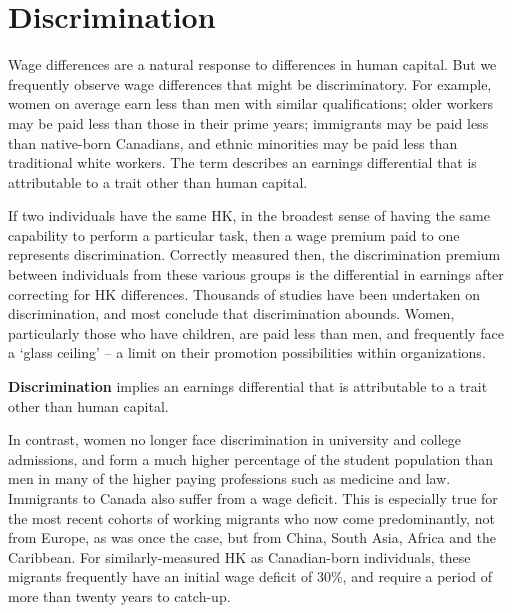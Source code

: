 \section{Discrimination}\label{sec:ch13sec6}

Wage differences are a natural response to differences in human capital. But
we frequently observe wage differences that might be discriminatory. For
example, women on average earn less than men with similar qualifications;
older workers may be paid less than those in their prime years; immigrants
may be paid less than native-born Canadians, and ethnic minorities may be
paid less than traditional white workers. The term %
 describes an earnings differential that is
attributable to a trait other than human capital.

If two individuals have the same HK, in the broadest sense of having the
same capability to perform a particular task, then a wage premium paid to
one represents discrimination. Correctly measured then, the discrimination
premium between individuals from these various groups is the differential in
earnings after correcting for HK differences. Thousands of studies have been
undertaken on discrimination, and most conclude that discrimination abounds.
Women, particularly those who have children, are paid less than men, and
frequently face a `glass ceiling' -- a limit on their promotion
possibilities within organizations.

\begin{DefBox}
	\textbf{Discrimination} implies an earnings differential that is attributable to a trait other than human capital.
\end{DefBox}

In contrast, women no longer face discrimination in university and college
admissions, and form a much higher percentage of the student population than
men in many of the higher paying professions such as medicine and law.
Immigrants to Canada also suffer from a wage deficit. This is especially
true for the most recent cohorts of working migrants who now come
predominantly, not from Europe, as was once the case, but from China, South
Asia, Africa and the Caribbean. For similarly-measured HK as Canadian-born
individuals, these migrants frequently have an initial wage deficit of 30\%,
and require a period of more than twenty years to catch-up.
